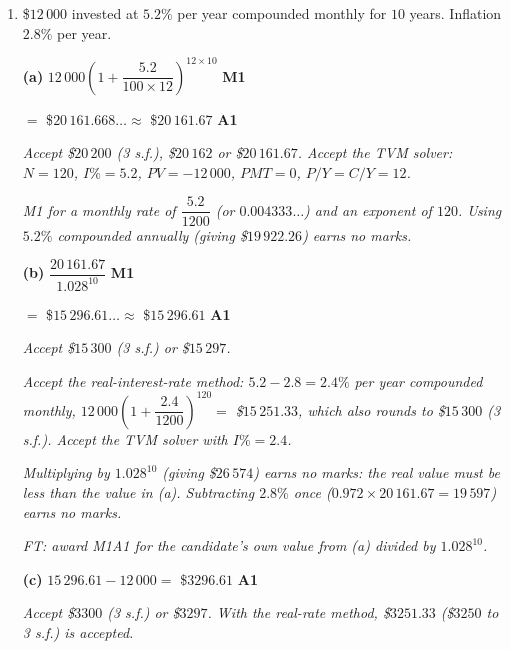 \documentclass[12pt, twoside]{article}
\begin{document}
\begin{enumerate}[itemsep=0.3cm]
\emph{$11.98$ is not an acceptable final answer --- the answer must be a
whole number of years. Rounding down to $11$ earns the M1 only.}

\newpage

\item[2.] [Maximum mark: 7]

\$$12\,000$ invested at $5.2\%$ per year compounded monthly for $10$
years. Inflation $2.8\%$ per year.

\medskip

\textbf{(a)} $12\,000\left(1 + \dfrac{5.2}{100 \times 12}\right)^{12
\times 10}$ \hfill \textbf{M1}

$=$ \$$20\,161.668\ldots \approx$ \$$20\,161.67$ \hfill \textbf{A1}

\emph{Accept \$$20\,200$ (3 s.f.), \$$20\,162$ or \$$20\,161.67$. Accept
the TVM solver: $N = 120$, $I\% = 5.2$, $PV = -12\,000$, $PMT = 0$,
$P/Y = C/Y = 12$.}

\emph{M1 for a monthly rate of $\dfrac{5.2}{1200}$ (or $0.004333\ldots$)
and an exponent of $120$. Using $5.2\%$ compounded annually (giving
\$$19\,922.26$) earns no marks.}

\medskip

\textbf{(b)} $\dfrac{20\,161.67}{1.028^{10}}$ \hfill \textbf{M1}

$=$ \$$15\,296.61\ldots \approx$ \$$15\,296.61$ \hfill \textbf{A1}

\emph{Accept \$$15\,300$ (3 s.f.) or \$$15\,297$.}

\emph{Accept the real-interest-rate method: $5.2 - 2.8 = 2.4\%$ per year
compounded monthly, $12\,000\left(1 + \dfrac{2.4}{1200}\right)^{120} =$
\$$15\,251.33$, which also rounds to \$$15\,300$ (3 s.f.). Accept the TVM
solver with $I\% = 2.4$.}

\emph{Multiplying by $1.028^{10}$ (giving \$$26\,574$) earns no marks: the
real value must be \emph{less} than the value in (a). Subtracting
$2.8\%$ once ($0.972 \times 20\,161.67 = 19\,597$) earns no marks.}

\emph{FT: award M1A1 for the candidate's own value from (a) divided by
$1.028^{10}$.}

\medskip

\textbf{(c)} $15\,296.61 - 12\,000 = $ \$$3296.61$ \hfill \textbf{A1}

\emph{Accept \$$3300$ (3 s.f.) or \$$3297$. With the real-rate method,
\$$3251.33$ (\$$3250$ to 3 s.f.) is accepted.}


\end{enumerate}
\end{document}
